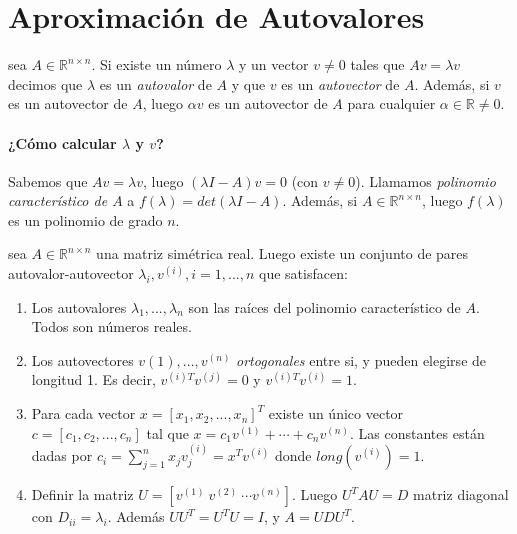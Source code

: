 \hypertarget{aproximaciuxf3n-de-autovalores}{%
\section{Aproximación de
Autovalores}\label{aproximaciuxf3n-de-autovalores}}

\Definicion sea \(A \in \ensuremath{\mathbb{R}}^{n \times n}\). Si
existe un número \(\lambda\) y un vector \(v \neq 0\) tales que
\(A v = \lambda v\) decimos que \(\lambda\) es un \emph{autovalor} de
\(A\) y que \(v\) es un \emph{autovector} de \(A\). Además, si \(v\) es
un autovector de \(A\), luego \(\alpha v\) es un autovector de \(A\)
para cualquier \(\alpha \in \ensuremath{\mathbb{R}}\neq 0\).

\hypertarget{cuxf3mo-calcular-lambda-y-v}{%
\paragraph{\texorpdfstring{¿Cómo calcular \(\lambda\) y
\(v\)?}{¿Cómo calcular \textbackslash{}lambda y v?}}\label{cuxf3mo-calcular-lambda-y-v}}

Sabemos que \(A v = \lambda v\), luego \((\lambda I - A) v = 0\) (con
\(v \neq 0\)). Llamamos \emph{polinomio característico de \(A\)} a
\(f(\lambda) = det(\lambda I - A)\). Además, si
\(A \in \ensuremath{\mathbb{R}}^{n \times n}\), luego \(f(\lambda)\) es
un polinomio de grado \(n\).

\Teorema sea \(A \in \ensuremath{\mathbb{R}}^{n \times n}\) una matriz
simétrica real. Luego existe un conjunto de pares autovalor-autovector
\({\lambda_i, v^{(i)}}, i=1,...,n\) que satisfacen:

\begin{enumerate}
\def\labelenumi{\arabic{enumi}.}
\item
  Los autovalores \(\lambda_1, ..., \lambda_n\) son las raíces del
  polinomio característico de \(A\). Todos son números reales.
\item
  Los autovectores \(v{(1)}, ..., v^{(n)}\) \emph{ortogonales} entre si,
  y pueden elegirse de longitud 1. Es decir, \(v^{(i)T} v^{(j)} = 0\) y
  \(v^{(i)T} v^{(i)} = 1\).
\item
  Para cada vector \(x = [x_1, x_2, ..., x_n]^T\) existe un único vector
  \(c = [c_1, c_2, ..., c_n]\) tal que
  \(x = c_1 v^{(1)} + \cdots + c_n v^{(n)}\). Las constantes están dadas
  por \(c_i = \sum_{j=1}^n x_j v_j^{(i)} = x^T v^{(i)}\) donde
  \(long(v^{(i)}) = 1\).
\item
  Definir la matriz \(U = [v^{(1)}\  v^{(2)}\  \cdots v^{(n)}]\). Luego
  \(U^T A U = D\) matriz diagonal con \(D_{ii} = \lambda_i\). Además
  \(U U^T = U^T U = I\), y \(A = U D U^T\).
\end{enumerate}


